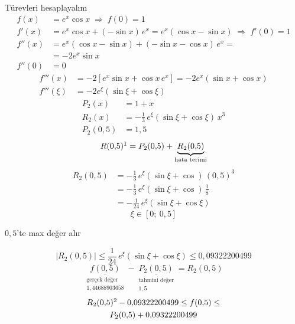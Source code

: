 \documentclass[11pt,a4paper]{article}
\begin{document}
\noindent Türevleri hesaplayalım
\begin{align*}
  f(x) &= e^x\cos x \;\Rightarrow\; f(0) = 1\\
  f'(x) &= e^x\cos x + (-\sin x)\,e^x = e^x(\cos x - \sin x) \;\Rightarrow\; f'(0) = 1\\
  f''(x) &= e^x(\cos x - \sin x) + (-\sin x - \cos x)\,e^x =\\
         &= -2e^x\sin x\\
  f''(0) &= 0
\end{align*}
\begin{align*}
  f'''(x) &= -2\left[e^x\sin x + \cos x\,e^x\right] = -2e^x(\sin x + \cos x)\\
  f'''(\xi) &= -2e^{\xi}(\sin\xi + \cos\xi)
\end{align*}
\begin{align*}
  P_2(x) &= 1 + x\\
  R_2(x) &= -\frac{1}{3}\,e^{\xi}(\sin\xi + \cos\xi)\,x^3\\
  P_2(0{,}5) &= 1{,}5
\end{align*}
\[
  R(0{,}5)\footnotemark = P_2(0{,}5) + \underbrace{R_2(0{,}5)}_{\text{hata terimi}}
\]
\begin{align*}
  R_2(0{,}5) &= -\frac{1}{3}\,e^{\xi}(\sin\xi + \cos)\,(0{,}5)^3\\
             &= -\frac{1}{3}\,e^{\xi}(\sin\xi + \cos)\,\frac{1}{8}\\
             &= -\frac{1}{24}\,e^{\xi}(\sin\xi + \cos\xi)
\end{align*}
\[
  \xi \in [0;\ 0{,}5]
\]
\begin{center}
$0{,}5$'te max değer alır
\end{center}
\[
  |R_2(0{,}5)| \le \frac{1}{24}\,e^{\xi}(\sin\xi + \cos\xi) \le 0{,}09322200499
\]
\[
  \underset{\substack{\text{gerçek değer}\\ 1{,}44688903658}}{\underline{f(0{,}5)}}
  - \underset{\substack{\text{tahmini değer}\\ 1{,}5}}{\underline{P_2(0{,}5)}} = R_2(0{,}5)
\]
\begin{gather*}
  R_2(0{,}5)\footnotemark - 0{,}09322200499 \le f(0{,}5) \le\\
  P_2(0{,}5) + 0{,}09322200499
\end{gather*}
\end{document}
